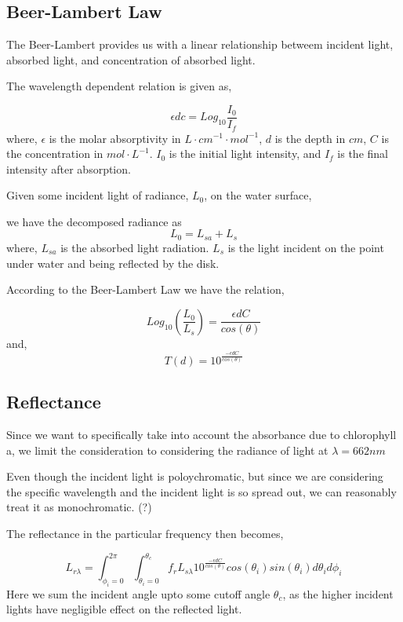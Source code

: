 \documentclass{article}
\begin{document}
\subsection{Beer-Lambert Law}

The Beer-Lambert provides us with a linear relationship betweem incident light, absorbed light,
and concentration of absorbed light.

The wavelength dependent relation is given as,

\begin{equation}
  \epsilon d c = Log_{10}{\frac{I_0}{I_f}}
\end{equation}
where, $\epsilon$ is the molar absorptivity in $ L \cdot cm^{-1} \cdot mol^{-1}$,
$ d$ is the depth in $cm$, $ C$ is the concentration in $mol \cdot L^{-1} $. $ I_0$
is the initial light intensity, and $ I_f$ is the final intensity after
absorption.

Given some incident light of radiance, $L_0$, on the water surface,

we have the decomposed radiance as
$$ L_0 = L_{sa} + L_{s}$$
where, $ L_{sa}$ is the absorbed light radiation. $ L_{s}$ is the light
incident on the point under water and being reflected by the disk.

According to the Beer-Lambert Law we have the relation,

\begin{equation}
  Log_{10}\left(\frac{L_0}{L_{s}}\right) = \frac{\epsilon d C}{cos(\theta)}
\end{equation}
and,
\begin{equation}
  T(d) = 10^\frac{-\epsilon d C}{cos(\theta)}
\end{equation}

\subsection{Reflectance}

Since we want to specifically take into account the
absorbance due to chlorophyll a, we limit the consideration
to considering the radiance of light at $\lambda = 662nm$

Even though the incident light is poloychromatic, but since we are considering the specific wavelength
and the incident light is so spread out, we can reasonably treat it as monochromatic. (?)

The reflectance in the particular frequency then becomes,

\begin{equation}
  L_{r \lambda} = \int^{2\pi}_{\phi_i = 0}\int^{\theta_c}_{\theta_i = 0}
  f_r L_{s\lambda} 10^\frac{-\epsilon d C}{cos(\theta)}cos(\theta_i)sin(\theta_i)d\theta_i d\phi_i
\end{equation}
Here we sum the incident angle upto some cutoff angle $\theta_c$, as the higher incident lights
have negligible effect on the reflected light.
\end{document}
